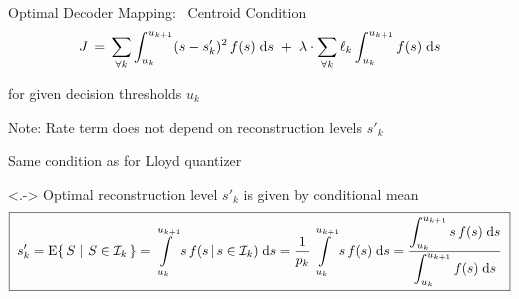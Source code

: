 

\begin{frame}{Optimal Decoder Mapping:~ Centroid Condition}
  \vspace{-1.0ex}
  $$
  J\,=\,\sum_{\forall k}\int_{u_k}^{u_{k+1}}(s-s'_k)^2\,f(s)\;\mathrm{d} s
  \;+\;\lambda\cdot\sum_{\forall k}\ell_k\int_{u_k}^{u_{k+1}}f(s)\;\mathrm{d} s
  $$
  \medskip
  \ben
\item<+->  for given decision thresholds $u_k$
  \bit{}
\item<+->Note: Rate term does not depend on reconstruction levels $s'_k$
\item<+->[\iarrow] Same condition as for Lloyd quantizer
  \eit
  \een
  \vspace{-1ex}
  \bit
\item<+->[\iarrow]\smallskip {}
  \bit{}
\item<.-> Optimal reconstruction level $s'_k$ is given by conditional mean
  \eit
  \vspace{.5ex}$$
  \boxed{\;s'_k
    = \mathrm{E}\!\left\{\,S\,\,|\,\,S\in{\mathcal{I}}_k\,\right\} 
    =  \int\limits_{u_k}^{u_{k+1}}s\, f(s\,|\, s\in{\mathcal{I}}_k)\;\mathrm{d} s
    =  \frac{1}{p_k}\int\limits_{u_k}^{u_{k+1}}s\, f(s)\;\mathrm{d} s
    =
    \frac{\displaystyle\int_{u_k}^{u_{k+1}}s\, f(s)\;\mathrm{d} s}
 	 {\displaystyle\int_{u_k}^{u_{k+1}}f(s)\;\mathrm{d} s}\;}
  $$
  \eit\vspace{-10ex}
\end{frame}
